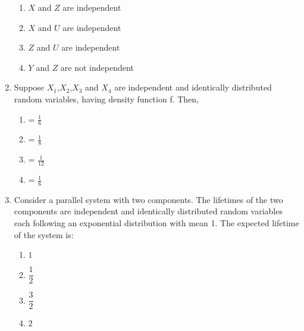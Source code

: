 \begin{enumerate}[label=\thesection.\arabic*.,ref=\thesection.\theenumi]
\begin{enumerate}
    \item $X$ and $Z$ are independent \label{dec2016-103:option 1}
    \item $X$ and $U$ are independent \label{dec2016-103:option 2}
    \item $Z$ and $U$ are independent \label{dec2016-103:option 3}
    \item $Y$ and $Z$ are not independent \label{dec2016-103:option 4}
\end{enumerate}
%
\solution

%
\item Suppose $X_1$,$X_2$,$X_3$ and $X_4$ are independent and identically distributed random variables, having density function f. Then,
\begin{enumerate}
\item {} = $\frac{1}{6}$
\item {} = $\frac{1}{8}$
\item {} = $\frac{1}{12}$
\item {} = $\frac{1}{6}$
\end{enumerate}
%
\solution

%
%
\item Consider a parallel system with two components. The lifetimes of the two components are independent and identically distributed random variables each following an exponential distribution with mean 1. The expected lifetime of the system is:
\begin{enumerate}[label=\Alph*)]
    \item $1$\\[0.5pt]
    \item $\dfrac{1}{2}$\\
    \item $\dfrac{3}{2}$\\
    \item $2$
\end{enumerate}
%
\solution


\end{enumerate}
